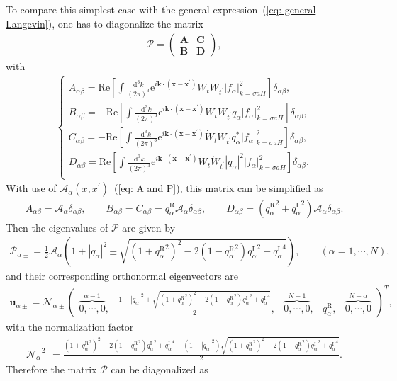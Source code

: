 \documentclass[aps, prd
, preprint
, nofootinbib 
]{revtex4-1}
\newcommand{\dd}{\mathrm{d}}
\newcommand{\ee}{\mathrm{e}}
\newcommand{\calP}{\mathcal{P}}
\renewcommand{\Re}{\mathrm{Re}}
\newcommand{\dk}{\frac{\dd^3k}{(2\pi)^3}}
\newcommand{\bae}[1]{\begin{align} #1 \end{align}}
\newcommand{\bce}[1]{\begin{cases} #1 \end{cases}}
\newcommand{\bpme}[1]{\begin{pmatrix} #1 \end{pmatrix}}
\begin{document}
\bigskip
To compare this simplest case with the general expression~(\ref{eq: general Langevin}),
one has to diagonalize the matrix
\bae{
	\bm{\calP}=
	\bpme{
		\bm{A} & \bm{C} \\
		\bm{B} & \bm{D} 
	},
}
with
\bae{
	\bce{
		\displaystyle
		A_{\alpha\beta}=\Re\left[\int\dk\ee^{i\mathbf{k}\cdot(\mathbf{x}-\mathbf{x}^\prime)}
		\dot{W}_t\dot{W}_{t^\prime}|f_\alpha|^2_{k=\sigma aH}\right]\delta_{\alpha\beta}, \\[10pt]
		\displaystyle
		B_{\alpha\beta}=-\Re\left[\int\dk\ee^{i\mathbf{k}\cdot(\mathbf{x}-\mathbf{x}^\prime)}
		\dot{W}_t\dot{W}_{t^\prime}q_\alpha|f_\alpha|^2_{k=\sigma aH}\right]\delta_{\alpha\beta}, \\[10pt]
		\displaystyle
		C_{\alpha\beta}=-\Re\left[\int\dk\ee^{i\mathbf{k}\cdot(\mathbf{x}-\mathbf{x}^\prime)}
		\dot{W}_t\dot{W}_{t^\prime}q_\alpha^*|f_\alpha|^2_{k=\sigma aH}\right]\delta_{\alpha\beta}, \\[10pt]
		\displaystyle
		D_{\alpha\beta}=\Re\left[\int\dk\ee^{i\mathbf{k}\cdot(\mathbf{x}-\mathbf{x}^\prime)}
		\dot{W}_t\dot{W}_{t^\prime}|q_\alpha|^2|f_\alpha|^2_{k=\sigma aH}\right]\delta_{\alpha\beta}. \\
	}
}
With use of $\mathcal{A}_\alpha(x,x^\prime)$~(\ref{eq: A and P}), this matrix can be simplified as
\bae{
	A_{\alpha\beta}=\mathcal{A}_\alpha\delta_{\alpha\beta}, \quad\quad 
	B_{\alpha\beta}=C_{\alpha\beta}=q_\alpha^\text{R}\mathcal{A}_\alpha\delta_{\alpha\beta}, \quad\quad 
	D_{\alpha\beta}=({q_\alpha^\text{R}}^2+{q_\alpha^\text{I}}^2)\mathcal{A}_\alpha\delta_{\alpha\beta}.
}
Then the eigenvalues of $\bm{\calP}$ are given by
\bae{
	\calP_{\alpha\pm}=
	\frac{1}{2}\mathcal{A}_\alpha\left(1+|q_\alpha|^2\pm\sqrt{(1+{q_\alpha^\text{R}}^2)^2-2(1-{q_\alpha^\text{R}}^2){q_\alpha^\text{I}}^2
	+{q_\alpha^\text{I}}^4}\right),
	\quad\quad (\alpha=1,\cdots, N),
}
and their corresponding orthonormal eigenvectors are
\bae{
	\bm{u}_{\alpha\pm}=\mathcal{N}_{\alpha\pm}
	\bpme{
		\overbrace{0,\cdots,0}^{\alpha-1}, & 
		\frac{1-|q_\alpha|^2\pm\sqrt{(1+{q_\alpha^\text{R}}^2)^2-2(1-{q_\alpha^\text{R}}^2){q_\alpha^\text{I}}^2+{q_\alpha^\text{I}}^4}}{2}, &
		\overbrace{0,\cdots,0}^{N-1}, & 
		q_\alpha^\text{R}, & 
		\overbrace{0,\cdots,0}^{N-\alpha}
	}^T,
}
with the normalization factor
\bae{
	\mathcal{N}_{\alpha\pm}^{-2}=\frac{(1+{q_\alpha^\text{R}}^2)^2-2(1-{q_\alpha^\text{R}}^2){q_\alpha^\text{I}}^2+{q_\alpha^\text{I}}^4
	\pm(1-|q_\alpha|^2)
	\sqrt{(1+{q_\alpha^\text{R}}^2)^2-2(1-{q_\alpha^\text{R}}^2){q_\alpha^\text{I}}^2+{q_\alpha^\text{I}}^4}}{2}.
}
Therefore the matrix $\bm{\calP}$ can be diagonalized as
\end{document}
